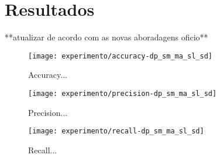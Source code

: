 \section{Resultados} **atualizar de acordo com as novas aboradagens oficio**

\begin{figure}[!htb] \centering 
  \centering
  \texttt{[image: experimento/accuracy-dp\_sm\_ma\_sl\_sd]} 
  \caption{Accuracy... } 
  \label{fig:accuracy_result}
\end{figure}

\begin{figure}[!htb] \centering 
  \centering
  \texttt{[image: experimento/precision-dp\_sm\_ma\_sl\_sd]} 
  \caption{Precision... } 
  \label{fig:precision_result}
\end{figure}

\begin{figure}[!htb] \centering 
  \centering
  \texttt{[image: experimento/recall-dp\_sm\_ma\_sl\_sd]} 
  \caption{Recall... } 
  \label{fig:recall_result}
\end{figure}

 


 

 
